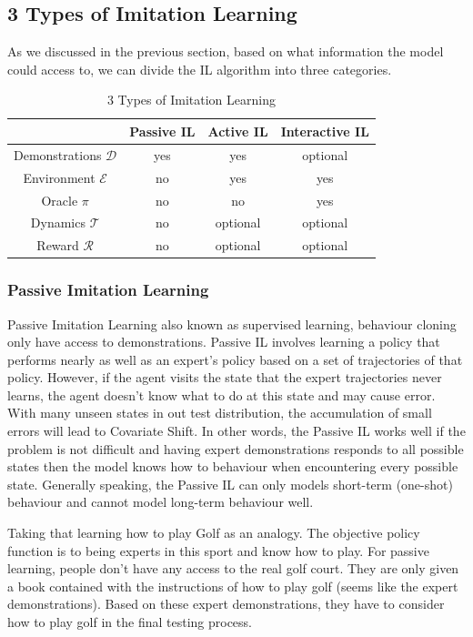 \documentclass[11pt]{article}
\begin{document}
\subsection{3 Types of Imitation Learning}
\normalfont
As we discussed in the previous section, based on what information the model could access to, we can divide the IL algorithm into three categories. 
\begin{table}[h]
    \centering
    \begin{tabular}{|c|c|c|c|}
        \hline& Passive IL &  Active IL & Interactive IL\\
        \hline Demonstrations $\mathcal{D}$ & yes & yes & optional \\ 
        \hline Environment $\mathcal{E}$ & no & yes & yes \\
        \hline Oracle $\pi$ & no & no & yes \\
        \hline Dynamics $\mathcal{T}$ & no & optional & optional \\
        \hline Reward $\mathcal{R}$ & no & optional & optional \\
        \hline
    \end{tabular}
    \caption{3 Types of Imitation Learning}
    \label{tab:my_label}
\end{table}

\subsubsection{Passive Imitation Learning}
\normalfont
Passive Imitation Learning also known as supervised learning, behaviour cloning only have access to demonstrations. Passive IL involves learning a policy that performs nearly as well as an expert’s policy based on a set of trajectories of that policy. However, if the agent visits the state that the expert trajectories never learns, the agent doesn't know what to do at this state and may cause error. With many unseen states in out test distribution, the accumulation of small errors will lead to Covariate Shift. In other words, the Passive IL works well if the problem is not difficult and having expert demonstrations responds to all possible states then the model knows how to behaviour when encountering every possible state. Generally speaking, the Passive IL can only models short-term (one-shot) behaviour and cannot model long-term behaviour well. 

Taking that learning how to play Golf as an analogy. The objective policy function is to being experts in this sport and know how to play. For passive learning, people don't have any access to the real golf court. They are only given a book contained with the instructions of how to play golf (seems like the expert demonstrations). Based on these expert demonstrations, they have to consider how to play golf in the final testing process.
\end{document}
